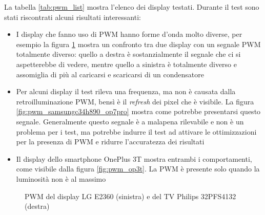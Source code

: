 La tabella \ref{tab:pwm_list} mostra l'elenco dei display testati. Durante il test sono stati riscontrati alcuni risultati interessanti:\begin{itemize}
	\item I display che fanno uso di PWM hanno forme d'onda molto diverse, per esempio la figura \ref{fig:pwm_lge2360_philips32pfs4132} mostra un confronto tra due display con un segnale PWM totalmente diverso: quello a destra è sostanzialmente il segnale che ci si aspetterebbe di vedere, mentre quello a sinistra è totalmente diverso e assomiglia di più al caricarsi e scaricarsi di un condensatore
	\item Per alcuni display il test rileva una frequenza, ma non è causata dalla retroilluminazione PWM, bensì è il \textit{refresh} dei pixel che è visibile. La figura \ref{fig:pwm_samsungc34h890_op7pro} mostra come potrebbe presentarsi questo segnale. Generalmente questo segnale è a malapena rilevabile e non è un problema per i test, ma potrebbe indurre il test ad attivare le ottimizzazioni per la presenza di PWM e ridurre l'accuratezza dei risultati
	\item Il display dello smartphone OnePlus 3T mostra entrambi i comportamenti, come visibile dalla figura \ref{fig:pwm_op3t}. La PWM è presente solo quando la luminosità non è al massimo
\end{itemize}

\begin{figure}[h!]
	\centering
	\caption{PWM del display LG E2360 (sinistra) e del TV Philips 32PFS4132 (destra)}
	\label{fig:pwm_lge2360_philips32pfs4132}
\end{figure}

